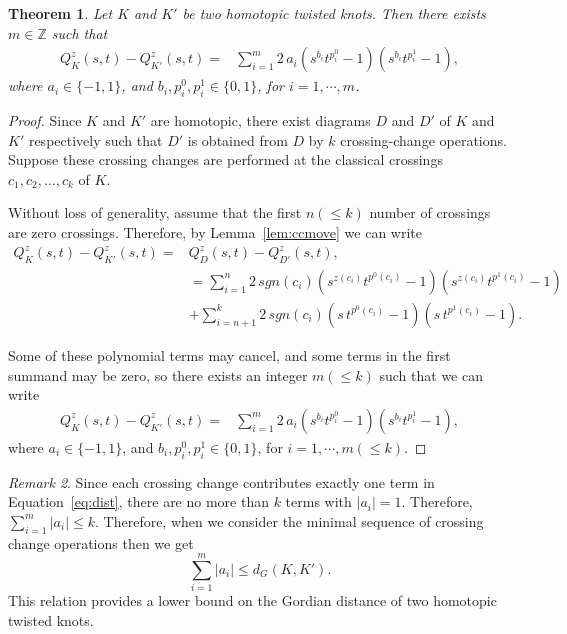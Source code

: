 \documentclass[10pt,a4paper,reqno]{amsart}
\newtheorem{theorem}{Theorem}[section]
\theoremstyle{definition}
\theoremstyle{remark}
\newtheorem{remark}[theorem]{Remark}
\begin{document}
\begin{theorem}\label{thm:homotopic}
	Let $K$ and $K'$ be two homotopic twisted knots. Then there exists $m
	\in \mathbb{Z}$ such that
	\begin{equation*}
	\begin{aligned}
		Q^{z}_{K}(s,t)-Q^{z}_{K'}(s,t) = &\sum_{i=1}^{m} 2\,a_{i}(s^{b_{i}}t^{p^{0}_{i}}-1)(s^{b_{i}}t^{p^{1}_{i}}-1),
	\end{aligned}
\end{equation*}
where  $a_{i}\in \{-1,1\}$, and $b_{i}, p^{0}_{i}, p^{1}_{i} \in \{0,1\}$, for $i = 1,\cdots, m$.
\end{theorem}
  \begin{proof}
  Since $K$ and $K'$ are homotopic, there exist diagrams $D$ and $D'$ of $K$ and $K'$ respectively such that $D'$ is obtained from $D$ by $k$ crossing-change operations.
  	Suppose these crossing changes are performed at the classical crossings
  	$c_1,c_2,\ldots,c_k$ of $K$.

 Without loss of generality, assume that the first $n(\leq k)$ number of crossings are zero crossings. Therefore, by Lemma~\ref{lem:ccmove} we can write
  	\begin{equation}\label{eq:dist}
  		\begin{aligned}
  			Q^{z}_{K}(s,t)-Q^{z}_{K'}(s,t) =& Q^{z}_{D}(s,t)-Q^{z}_{D'}(s,t),\\
  			& =\sum_{i=1}^{n} 2\,sgn(c_{i})(s^{z(c_{i})}t^{p^{0}(c_{i})}-1)(s^{z(c_{i})}t^{p^{1}(c_{i})}-1) \\
  			&+ \sum_{i=n+1}^{k} 2\,sgn(c_{i})(s\,t^{p^{0}(c_{i})}-1)(s\,t^{p^{1}(c_{i})}-1).
  		\end{aligned}
  	\end{equation}
  
  Some of these polynomial terms may cancel, and some terms in the first summand may be zero, so there exists an integer $m(\leq k)$ such that we can write
  	\begin{equation*}
  		\begin{aligned}
  			Q^{z}_{K}(s,t)-Q^{z}_{K'}(s,t) = &\sum_{i=1}^{m} 2\,a_{i}(s^{b_{i}}t^{p^{0}_{i}}-1)(s^{b_{i}}t^{p^{1}_{i}}-1),
  		\end{aligned}
  	\end{equation*}
  		where  $a_{i}\in \{-1,1\}$, and $b_{i}, p^{0}_{i}, p^{1}_{i} \in \{0,1\}$, for $i = 1, \cdots, m (\leq k)$. 
  		 \end{proof}
  		 \begin{remark}
  		 Since  each crossing change contributes exactly one term in Equation~\ref{eq:dist}, there are no more than $k$ terms with $|a_{i}|=1$. Therefore, $
  		 \sum_{i =1}^{m}|a_i|
  		 \le k.$
  		  Therefore, when we consider the minimal sequence of crossing change operations then we get
  		   \[\sum_{i=1}^{m}|a_i|
  		 \le d_{G}(K,K').\]
  		 This relation provides a lower bound on the Gordian distance of two homotopic twisted knots.
  		
  		 \end{remark}
\end{document}
